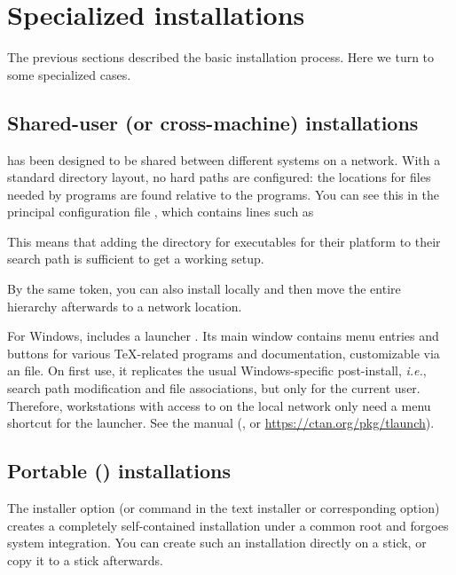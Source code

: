 \documentclass{article}
\begin{document}
\section{Specialized installations}

The previous sections described the basic installation process.  Here we
turn to some specialized cases.

\subsection{Shared-user (or cross-machine) installations}
\label{sec:sharedinstall}

\TL{} has been designed to be shared between different systems on a
network. With a standard directory layout, no hard paths are
configured: the locations for files needed by \TL{} programs are
found relative to the programs.  You can see this in the principal
configuration file
, which contains lines such as
This means that adding the directory for \TL{} executables for their
platform to their search path is sufficient to get a working setup.

By the same token, you can also install \TL{} locally and then move
the entire hierarchy afterwards to a network location.

For Windows, \TL{} includes a launcher . Its main
window contains menu entries and buttons for various \TeX-related
programs and documentation, customizable via an  file.  On
first use, it replicates the usual Windows-specific post-install,
\emph{i.e.}, search path modification and file associations, but only
for the current user. Therefore, workstations with access to \TL{} on
the local network only need a menu shortcut for the launcher.  See the
 manual (, or
\url{https://ctan.org/pkg/tlaunch}).


\subsection{Portable (\USB{}) installations}
\label{sec:portable-tl}

The  installer option (or  command in the text
installer or corresponding \GUI{} option) creates a completely
self-contained \TL{} installation under a common root and forgoes system
integration. You can create such an installation directly on a \USB{}
stick, or copy it to a \USB{} stick afterwards.
\end{document}
